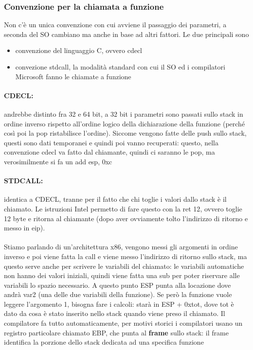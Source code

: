 \documentclass[12pt, oneside]{extbook}
\begin{document}
\subsubsection{Convenzione per la chiamata a funzione}
Non c'è un unica convenzione con cui avviene il passaggio dei parametri, a seconda del SO cambiano ma anche in base ad altri fattori. Le due principali sono 
\begin{itemize}
\item convenzione del linguaggio C, ovvero cdecl
\item convezione stdcall, la modalità standard con cui il SO ed i compilatori Microsoft fanno le chiamate a funzione
\end{itemize}
\paragraph{CDECL:} andrebbe distinto fra 32 e 64 bit, a 32 bit i parametri sono passati sullo stack in ordine inverso rispetto all'ordine logico della dichiarazione della funzione (perché così poi la pop ristabilisce l'ordine). Siccome vengono fatte delle push sullo stack, questi sono dati temporanei e quindi poi vanno recuperati: questo, nella convenzione cdecl va fatto dal chiamante, quindi ci saranno le pop, ma verosimilmente si fa un \textsf{add esp, 0xc}
\paragraph{STDCALL:} identica a CDECL, tranne per il fatto che chi toglie i valori dallo stack è il chiamato. Le istruzioni Intel permetto di fare questo con la \textsf{ret 12}, ovvero toglie 12 byte e ritorna al chiamante (dopo aver ovviamente tolto l'indirizzo di ritorno e messo in eip). \\\\
Stiamo parlando di un'architettura x86, vengono messi gli argomenti in ordine inverso e poi viene fatta la call e viene messo l'indirizzo di ritorno sullo stack, ma questo serve anche per scrivere le variabili del chiamato: le variabili automatiche non hanno dei valori iniziali, quindi viene fatta una \textsf{sub} per poter riservare alle variabili lo spazio necessario. A questo punto ESP punta alla locazione dove andrà var2 (una delle due variabili della funzione). Se però la funzione vuole leggere l'argomento 1, bisogna fare i calcoli: starà in ESP + 0xtot, dove tot è dato da cosa è stato inserito nello stack quando viene preso il chiamato. Il compilatore fa tutto automaticamente, per motivi storici i compilatori usano un registro particolare chiamato EBP, che punta al \textbf{frame} sullo stack: il frame identifica la porzione dello stack dedicata ad una specifica funzione
\end{document}
